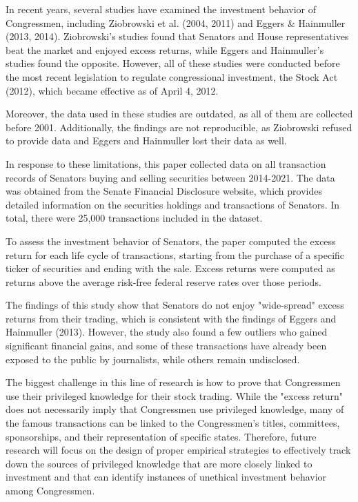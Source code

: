 \documentclass[12pt,letterpaper]{article}
\begin{document}
In recent years, several studies have examined the investment behavior of Congressmen, including Ziobrowski et al. (2004, 2011) and Eggers & Hainmuller (2013, 2014). Ziobrowski's studies found that Senators and House representatives beat the market and enjoyed excess returns, while Eggers and Hainmuller's studies found the opposite. However, all of these studies were conducted before the most recent legislation to regulate congressional investment, the Stock Act (2012), which became effective as of April 4, 2012.

Moreover, the data used in these studies are outdated, as all of them are collected before 2001. Additionally, the findings are not reproducible, as Ziobrowski refused to provide data and Eggers and Hainmuller lost their data as well.

In response to these limitations, this paper collected data on all transaction records of Senators buying and selling securities between 2014-2021. The data was obtained from the Senate Financial Disclosure website, which provides detailed information on the securities holdings and transactions of Senators. In total, there were 25,000 transactions included in the dataset.

To assess the investment behavior of Senators, the paper computed the excess return for each life cycle of transactions, starting from the purchase of a specific ticker of securities and ending with the sale. Excess returns were computed as returns above the average risk-free federal reserve rates over those periods.

The findings of this study show that Senators do not enjoy "wide-spread" excess returns from their trading, which is consistent with the findings of Eggers and Hainmuller (2013). However, the study also found a few outliers who gained significant financial gains, and some of these transactions have already been exposed to the public by journalists, while others remain undisclosed.

The biggest challenge in this line of research is how to prove that Congressmen use their privileged knowledge for their stock trading. While the "excess return" does not necessarily imply that Congressmen use privileged knowledge, many of the famous transactions can be linked to the Congressmen's titles, committees, sponsorships, and their representation of specific states. Therefore, future research will focus on the design of proper empirical strategies to effectively track down the sources of privileged knowledge that are more closely linked to investment and that can identify instances of unethical investment behavior among Congressmen.
% 
\end{document}
